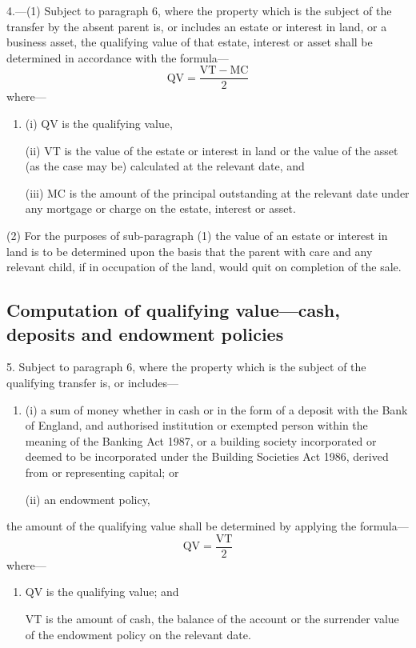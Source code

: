 \documentclass[12pt,a4paper]{article}
\begin{document}
4.—(1) Subject to paragraph 6, where the property which is the subject of the transfer by the absent parent is, or includes an estate or interest in land, or a business asset, the qualifying value of that estate, interest or asset shall be determined in accordance with the formula—
\[\mathrm{QV} = \frac{\mathrm{VT} - \mathrm{MC}}{2}\]
where—
\begin{enumerate}\item[]
(i) QV is the qualifying value,

(ii) VT is the value of the estate or interest in land or the value of the asset (as the case may be) calculated at the relevant date, and

(iii) MC is the amount of the principal outstanding at the relevant date under any mortgage or charge on the estate, interest or asset.
\end{enumerate}

(2) For the purposes of sub-paragraph (1) the value of an estate or interest in land is to be determined upon the basis that the parent with care and any relevant child, if in occupation of the land, would quit on completion of the sale.

\subsection*{Computation of qualifying value—cash, deposits and endowment policies}

5.  Subject to paragraph 6, where the property which is the subject of the qualifying transfer is, or includes—
\begin{enumerate}\item[]
(i) a sum of money whether in cash or in the form of a deposit with the Bank of England, and authorised institution or exempted person within the meaning of the Banking Act 1987, or a building society incorporated or deemed to be incorporated under the Building Societies Act 1986, derived from or representing capital; or

(ii) an endowment policy,
\end{enumerate}
the amount of the qualifying value shall be determined by applying the formula—
\[ \mathrm{QV} = \frac{\mathrm{VT}}{2}\]
where—
\begin{enumerate}\item[]
QV is the qualifying value; and

VT is the amount of cash, the balance of the account or the surrender value of the endowment policy on the relevant date.
\end{enumerate}
\end{document}
